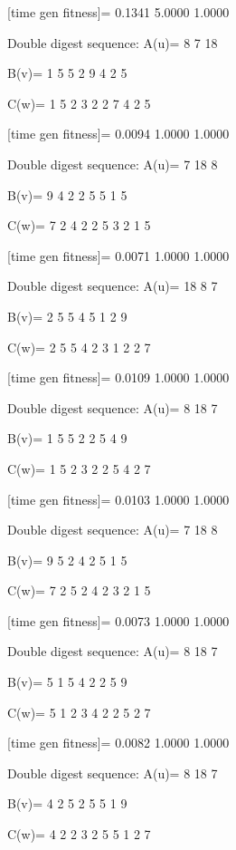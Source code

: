 [time gen fitness]=
    0.1341    5.0000    1.0000

Double digest sequence:
A(u)=
     8     7    18

B(v)=
     1     5     5     2     9     4     2     5

C(w)=
     1     5     2     3     2     2     7     4     2     5

[time gen fitness]=
    0.0094    1.0000    1.0000

Double digest sequence:
A(u)=
     7    18     8

B(v)=
     9     4     2     2     5     5     1     5

C(w)=
     7     2     4     2     2     5     3     2     1     5

[time gen fitness]=
    0.0071    1.0000    1.0000

Double digest sequence:
A(u)=
    18     8     7

B(v)=
     2     5     5     4     5     1     2     9

C(w)=
     2     5     5     4     2     3     1     2     2     7

[time gen fitness]=
    0.0109    1.0000    1.0000

Double digest sequence:
A(u)=
     8    18     7

B(v)=
     1     5     5     2     2     5     4     9

C(w)=
     1     5     2     3     2     2     5     4     2     7

[time gen fitness]=
    0.0103    1.0000    1.0000

Double digest sequence:
A(u)=
     7    18     8

B(v)=
     9     5     2     4     2     5     1     5

C(w)=
     7     2     5     2     4     2     3     2     1     5

[time gen fitness]=
    0.0073    1.0000    1.0000

Double digest sequence:
A(u)=
     8    18     7

B(v)=
     5     1     5     4     2     2     5     9

C(w)=
     5     1     2     3     4     2     2     5     2     7

[time gen fitness]=
    0.0082    1.0000    1.0000

Double digest sequence:
A(u)=
     8    18     7

B(v)=
     4     2     5     2     5     5     1     9

C(w)=
     4     2     2     3     2     5     5     1     2     7

